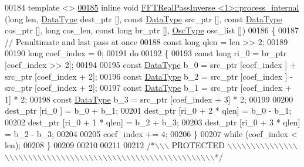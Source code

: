 \begin{DoxyCode}
00184 \textcolor{keyword}{template} <>
\hypertarget{a00103_source_l00185}{}\hyperlink{a00014_a1332f7f4353c81be1498e859b1e2eb5a}{00185} \textcolor{keyword}{inline} \textcolor{keywordtype}{void} \hyperlink{a00014}{FFTRealPassInverse <1>::process\_internal} (\textcolor{keywordtype}{long} len, 
      \hyperlink{a00014_adecc3668f71245ef20a93546a55b3190}{DataType} dest\_ptr [], \textcolor{keyword}{const} \hyperlink{a00014_adecc3668f71245ef20a93546a55b3190}{DataType} src\_ptr [], \textcolor{keyword}{const} \hyperlink{a00014_adecc3668f71245ef20a93546a55b3190}{DataType} cos\_ptr [], \textcolor{keywordtype}{long} 
      cos\_len, \textcolor{keyword}{const} \textcolor{keywordtype}{long} br\_ptr [], \hyperlink{a00020}{OscType} osc\_list [])
00186 \{
00187     \textcolor{comment}{// Penultimate and last pass at once}
00188     \textcolor{keyword}{const} \textcolor{keywordtype}{long}      qlen = len >> 2;
00189 
00190     \textcolor{keywordtype}{long}                coef\_index = 0;
00191     \textcolor{keywordflow}{do}
00192     \{
00193         \textcolor{keyword}{const} \textcolor{keywordtype}{long}      ri\_0 = br\_ptr [coef\_index >> 2];
00194 
00195         \textcolor{keyword}{const} \hyperlink{a00014_adecc3668f71245ef20a93546a55b3190}{DataType}  b\_0 = src\_ptr [coef\_index    ] + src\_ptr [coef\_index + 2];
00196         \textcolor{keyword}{const} \hyperlink{a00014_adecc3668f71245ef20a93546a55b3190}{DataType}  b\_2 = src\_ptr [coef\_index    ] - src\_ptr [coef\_index + 2];
00197         \textcolor{keyword}{const} \hyperlink{a00014_adecc3668f71245ef20a93546a55b3190}{DataType}  b\_1 = src\_ptr [coef\_index + 1] * 2;
00198         \textcolor{keyword}{const} \hyperlink{a00014_adecc3668f71245ef20a93546a55b3190}{DataType}  b\_3 = src\_ptr [coef\_index + 3] * 2;
00199 
00200         dest\_ptr [ri\_0           ] = b\_0 + b\_1;
00201         dest\_ptr [ri\_0 + 2 * qlen] = b\_0 - b\_1;
00202         dest\_ptr [ri\_0 + 1 * qlen] = b\_2 + b\_3;
00203         dest\_ptr [ri\_0 + 3 * qlen] = b\_2 - b\_3;
00204 
00205         coef\_index += 4;
00206     \}
00207     \textcolor{keywordflow}{while} (coef\_index < len);
00208 \}
00209 
00210 
00211 
00212 \textcolor{comment}{/*\(\backslash\)\(\backslash\)\(\backslash\) PROTECTED \(\backslash\)\(\backslash\)\(\backslash\)\(\backslash\)\(\backslash\)\(\backslash\)\(\backslash\)\(\backslash\)\(\backslash\)\(\backslash\)\(\backslash\)\(\backslash\)\(\backslash\)\(\backslash\)\(\backslash\)\(\backslash\)\(\backslash\)\(\backslash\)\(\backslash\)\(\backslash\)\(\backslash\)\(\backslash\)\(\backslash\)\(\backslash\)\(\backslash\)\(\backslash\)\(\backslash\)\(\backslash\)\(\backslash\)\(\backslash\)\(\backslash\)\(\backslash\)\(\backslash\)\(\backslash\)\(\backslash\)\(\backslash\)\(\backslash\)\(\backslash\)\(\backslash\)\(\backslash\)\(\backslash\)\(\backslash\)\(\backslash\)\(\backslash\)\(\backslash\)\(\backslash\)\(\backslash\)\(\backslash\)\(\backslash\)\(\backslash\)\(\backslash\)\(\backslash\)\(\backslash\)\(\backslash\)\(\backslash\)\(\backslash\)\(\backslash\)\(\backslash\)\(\backslash\)\(\backslash\)*/}

\end{DoxyCode}
